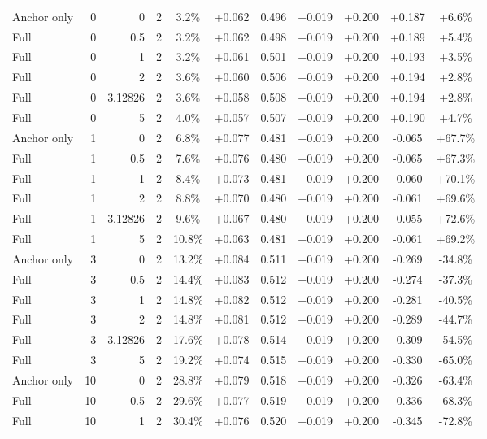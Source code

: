 \begin{table}[htbp]
\begin{tabular}{lrrrccccccc}
Anchor only & 0 & 0 & 2 & 3.2\% & +0.062 & 0.496 & +0.019 & +0.200 & +0.187 & +6.6\% \\
Full & 0 & 0.5 & 2 & 3.2\% & +0.062 & 0.498 & +0.019 & +0.200 & +0.189 & +5.4\% \\
Full & 0 & 1 & 2 & 3.2\% & +0.061 & 0.501 & +0.019 & +0.200 & +0.193 & +3.5\% \\
Full & 0 & 2 & 2 & 3.6\% & +0.060 & 0.506 & +0.019 & +0.200 & +0.194 & +2.8\% \\
Full & 0 & 3.12826 & 2 & 3.6\% & +0.058 & 0.508 & +0.019 & +0.200 & +0.194 & +2.8\% \\
Full & 0 & 5 & 2 & 4.0\% & +0.057 & 0.507 & +0.019 & +0.200 & +0.190 & +4.7\% \\
Anchor only & 1 & 0 & 2 & 6.8\% & +0.077 & 0.481 & +0.019 & +0.200 & -0.065 & +67.7\% \\
Full & 1 & 0.5 & 2 & 7.6\% & +0.076 & 0.480 & +0.019 & +0.200 & -0.065 & +67.3\% \\
Full & 1 & 1 & 2 & 8.4\% & +0.073 & 0.481 & +0.019 & +0.200 & -0.060 & +70.1\% \\
Full & 1 & 2 & 2 & 8.8\% & +0.070 & 0.480 & +0.019 & +0.200 & -0.061 & +69.6\% \\
Full & 1 & 3.12826 & 2 & 9.6\% & +0.067 & 0.480 & +0.019 & +0.200 & -0.055 & +72.6\% \\
Full & 1 & 5 & 2 & 10.8\% & +0.063 & 0.481 & +0.019 & +0.200 & -0.061 & +69.2\% \\
Anchor only & 3 & 0 & 2 & 13.2\% & +0.084 & 0.511 & +0.019 & +0.200 & -0.269 & -34.8\% \\
Full & 3 & 0.5 & 2 & 14.4\% & +0.083 & 0.512 & +0.019 & +0.200 & -0.274 & -37.3\% \\
Full & 3 & 1 & 2 & 14.8\% & +0.082 & 0.512 & +0.019 & +0.200 & -0.281 & -40.5\% \\
Full & 3 & 2 & 2 & 14.8\% & +0.081 & 0.512 & +0.019 & +0.200 & -0.289 & -44.7\% \\
Full & 3 & 3.12826 & 2 & 17.6\% & +0.078 & 0.514 & +0.019 & +0.200 & -0.309 & -54.5\% \\
Full & 3 & 5 & 2 & 19.2\% & +0.074 & 0.515 & +0.019 & +0.200 & -0.330 & -65.0\% \\
Anchor only & 10 & 0 & 2 & 28.8\% & +0.079 & 0.518 & +0.019 & +0.200 & -0.326 & -63.4\% \\
Full & 10 & 0.5 & 2 & 29.6\% & +0.077 & 0.519 & +0.019 & +0.200 & -0.336 & -68.3\% \\
Full & 10 & 1 & 2 & 30.4\% & +0.076 & 0.520 & +0.019 & +0.200 & -0.345 & -72.8\% \\

\end{tabular}
\end{table}

